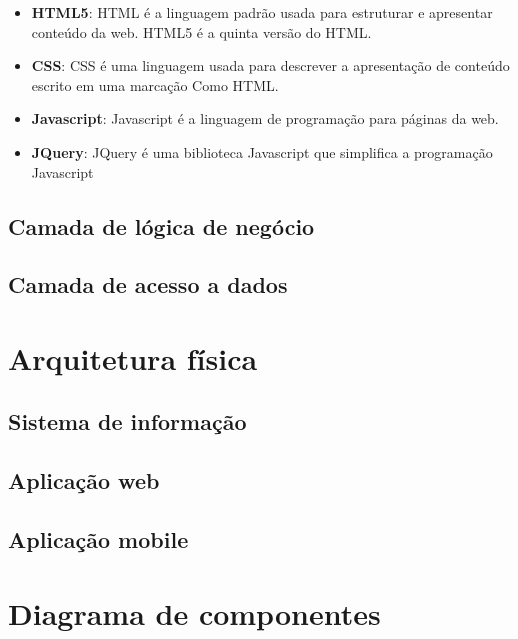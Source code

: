 \begin{itemize}
	\item \textbf{HTML5}: \ac{HTML} é a linguagem padrão usada para estruturar e apresentar conteúdo da web. HTML5 é a quinta versão do HTML.
	\item \textbf{CSS}: \ac{CSS} é uma linguagem usada para descrever a apresentação de conteúdo escrito em uma marcação Como HTML.
	\item \textbf{Javascript}: Javascript é a linguagem de programação para páginas da web.
	\item \textbf{JQuery}: JQuery é uma biblioteca Javascript que simplifica a programação Javascript
\end{itemize}









\subsection{Camada de lógica de negócio}



\subsection{Camada de acesso a dados}




\section{Arquitetura física}


\subsection{Sistema de informação}

\subsection{Aplicação web}


\subsection{Aplicação mobile}





\section{Diagrama de componentes}




